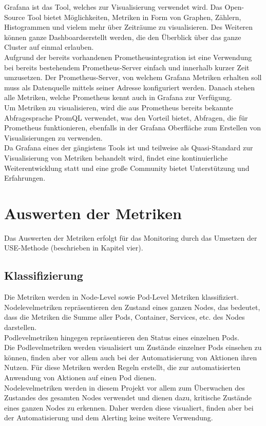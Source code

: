 \documentclass[a4paper,10pt]{scrartcl}
\begin{document}
Grafana ist das Tool, welches zur Visualisierung verwendet wird. Das Open-Source Tool bietet Möglichkeiten, Metriken in Form von Graphen, Zählern, Histogrammen und vielem mehr über Zeiträume zu visualisieren. Des Weiteren können ganze \glqq Dashboards\grqq erstellt werden, die den Überblick über das ganze Cluster auf einmal erlauben.\\
Aufgrund der bereits vorhandenen Prometheusintegration ist eine Verwendung bei bereits bestehendem Prometheus-Server einfach und innerhalb kurzer Zeit umzusetzen.
Der Prometheus-Server, von welchem Grafana Metriken erhalten soll muss als Datenquelle mittels seiner Adresse konfiguriert werden. Danach stehen alle Metriken, welche Prometheus kennt auch in Grafana zur Verfügung.\\
Um Metriken zu visualisieren, wird die aus Prometheus bereits bekannte Abfragesprache PromQL verwendet, was den Vorteil bietet, Abfragen, die für Prometheus funktionieren, ebenfalls in der Grafana Oberfläche zum Erstellen von Visualisierungen zu verwenden.\\
Da Grafana eines der gängistens Tools ist und teilweise als Quasi-Standard zur Visualisierung von Metriken behandelt wird, findet eine kontinuierliche Weiterentwicklung statt und eine große Community bietet Unterstützung und Erfahrungen.\\%

\section{Auswerten der Metriken}

Das Auswerten der Metriken erfolgt für das Monitoring durch das Umsetzen der USE-Methode (beschrieben in Kapitel vier).

\subsection{Klassifizierung}

Die Metriken werden in Node-Level sowie Pod-Level Metriken klassifiziert.\\
Nodelevelmetriken repräsentieren den Zustand eines ganzen Nodes, das bedeutet, dass die Metriken die Summe aller Pods, Container, Services, etc. des Nodes darstellen.\\
Podlevelmetriken hingegen repräsentieren den Status eines einzelnen Pods.\\
Die Podlevelmetriken werden visualisiert um Zustände einzelner Pods einsehen zu können, finden aber vor allem auch bei der Automatisierung von Aktionen ihren Nutzen. Für diese Metriken werden Regeln erstellt, die zur automatisierten Anwendung von Aktionen auf einen Pod dienen.\\
Nodelevelmetriken werden in diesem Projekt vor allem zum Überwachen des Zustandes des gesamten Nodes verwendet und dienen dazu, kritische Zustände eines ganzen Nodes zu erkennen. Daher werden diese visualiert, finden aber bei der Automatisierung und dem Alerting keine weitere Verwendung.
\end{document}

